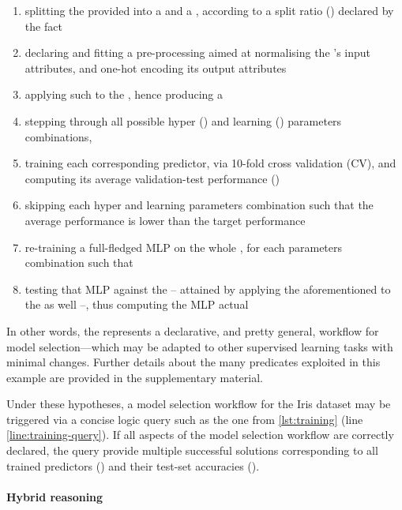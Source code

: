 \documentclass[runningheads]{llncs}
\begin{document}
\begin{enumerate}
    \item splitting the provided  into a  and a , according to a split ratio () declared by the  fact
    \item declaring and fitting a pre-processing  aimed at normalising the 's input attributes, and one-hot encoding its output attributes
    \item applying such  to the , hence producing a 
    \item stepping through all possible hyper () and learning () parameters combinations,
    \item training each corresponding predictor, via 10-fold cross validation (CV), and computing its average validation-test performance ()
    \item skipping each hyper and learning parameters combination such that the average performance  is lower than the target performance 
    \item re-training a full-fledged MLP on the whole , for each parameters combination such that 
    \item testing that MLP against the  -- attained by applying the aforementioned  to the  as well --, thus computing the MLP actual 
\end{enumerate}
%
In other words, the  represents a declarative, and pretty general, workflow for model selection---which may be adapted to other supervised learning tasks with minimal changes.
%
Further details about the many predicates exploited in this example are provided in the supplementary material.

Under these hypotheses, a model selection workflow for the Iris dataset may be triggered via a concise logic query such as the one from \cref{lst:training} (line \ref{line:training-query}).
%
If all aspects of the model selection workflow are correctly declared, the query provide multiple successful solutions corresponding to all trained predictors () and their test-set accuracies ().

\paragraph{Hybrid reasoning}
\end{document}
